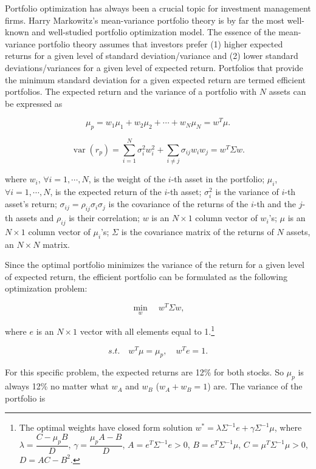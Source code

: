 \begin{solution}
Portfolio optimization has always been a crucial topic for investment management firms.
Harry Markowitz's mean-variance portfolio theory is by far the most well-known and
well-studied portfolio optimization model. The essence of the mean-variance portfolio
theory assumes that investors prefer (1) higher expected returns for a given level of
standard deviation/variance and (2) lower standard deviations/variances for a given level
of expected return. Portfolios that provide the minimum standard deviation for a given
expected return are termed efficient portfolios. The expected return and the variance of a
portfolio with $N$ assets can be expressed as

\[
\mu_p=w_1\mu_1+w_2\mu_2+\cdots+w_N\mu_N=w^T\mu.
\]

\[
\operatorname{var}(r_p)=\sum_{i=1}^{N}\sigma_i^2w_i^2
+\sum_{i\ne j}\sigma_{ij}w_iw_j=w^T\Sigma w.
\]

where $w_i$, $\forall i=1,\cdots,N$, is the weight of the $i$-th asset in the portfolio;
$\mu_i$, $\forall i=1,\cdots,N$, is the expected return of the $i$-th asset; $\sigma_i^2$
is the variance of $i$-th asset's return; $\sigma_{ij}=\rho_{ij}\sigma_i\sigma_j$ is the
covariance of the returns of the $i$-th and the $j$-th assets and $\rho_{ij}$ is their
correlation; $w$ is an $N\times1$ column vector of $w_i$'s; $\mu$ is an $N\times1$
column vector of $\mu_i$'s; $\Sigma$ is the covariance matrix of the returns of $N$
assets, an $N\times N$ matrix.

Since the optimal portfolio minimizes the variance of the return for a given level of
expected return, the efficient portfolio can be formulated as the following optimization
problem:


\[
\min_{w}\quad w^T\Sigma w,
\]

where $e$ is an $N\times1$ vector with all elements equal to 1.\footnote[13]{The
optimal weights have closed form solution $w^*=\lambda\Sigma^{-1}e+\gamma\Sigma^{-1}\mu$,
where $\lambda=\dfrac{C-\mu_pB}{D}$, $\gamma=\dfrac{\mu_pA-B}{D}$,
$A=e^T\Sigma^{-1}e>0$, $B=e^T\Sigma^{-1}\mu$, $C=\mu^T\Sigma^{-1}\mu>0$,
$D=AC-B^2$.}

\[
\textit{s.t.}\quad w^T\mu=\mu_p,\quad w^Te=1.
\]

For this specific problem, the expected returns are 12\% for both stocks. So $\mu_p$ is
always 12\% no matter what $w_A$ and $w_B$ ($w_A+w_B=1$) are. The variance of the
portfolio is


\end{solution}
